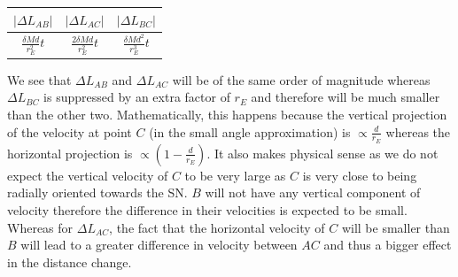 \documentclass[aps,showpacs,twocolumn,floats,prd,superscriptaddress,nofootinbib]{revtex4-1}
\begin{document}
\begin{center}
\begin{tabular}{| c | c | c |} 
\hline
$|\Delta L_{AB}|$ & $|\Delta L_{AC}|$ & $ | \Delta L_{BC} |$  \\   \hline 
$\frac{\delta M d}{r_E^2} t$ &  $\frac{2 \delta M d}{r_E^2} t$ & $ \frac{\delta M d^2}{r_E^3} t$  \\ 
\hline 
\end{tabular}
\end{center}

We see that $\Delta L_{AB}$ and $\Delta L_{AC}$ will be of the same order of magnitude whereas $\Delta L_{BC}$ is suppressed by an extra factor of $r_E$ and therefore will be much smaller than the other two. Mathematically, this happens because the vertical projection of the velocity at point $C$ (in the small angle approximation) is $\propto \frac{d}{r_E}$ whereas the horizontal projection is $\propto  \left( 1 - \frac{d}{r_E} \right)$. It also makes physical sense as we do not expect the vertical velocity of $C$ to be very large as $C$ is very close to being radially oriented towards the SN. $B$ will not have any vertical component of velocity therefore the difference in their velocities is expected to be small. Whereas for $\Delta L_{AC}$, the fact that the horizontal velocity of $C$ will be smaller than $B$ will lead to a greater difference in velocity between $AC$ and thus a bigger effect in the distance change. 
\end{document}
